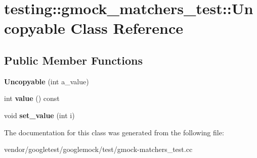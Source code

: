 \hypertarget{classtesting_1_1gmock__matchers__test_1_1_uncopyable}{}\section{testing\+:\+:gmock\+\_\+matchers\+\_\+test\+:\+:Uncopyable Class Reference}
\label{classtesting_1_1gmock__matchers__test_1_1_uncopyable}
\subsection*{Public Member Functions}
\begin{DoxyCompactItemize}
\item 
\mbox{\label{classtesting_1_1gmock__matchers__test_1_1_uncopyable_a827c1de4fe4c2e40791dd87a13972bc7}} 
{\bfseries Uncopyable} (int a\+\_\+value)
\item 
\mbox{\label{classtesting_1_1gmock__matchers__test_1_1_uncopyable_a23512131b948e40ded06555848829866}} 
int {\bfseries value} () const
\item 
\mbox{\label{classtesting_1_1gmock__matchers__test_1_1_uncopyable_a3f30b54f22caac3aa7e6fb79012dc52f}} 
void {\bfseries set\+\_\+value} (int i)
\end{DoxyCompactItemize}


The documentation for this class was generated from the following file\+:\begin{DoxyCompactItemize}
\item 
vendor/googletest/googlemock/test/gmock-\/matchers\+\_\+test.\+cc\end{DoxyCompactItemize}
